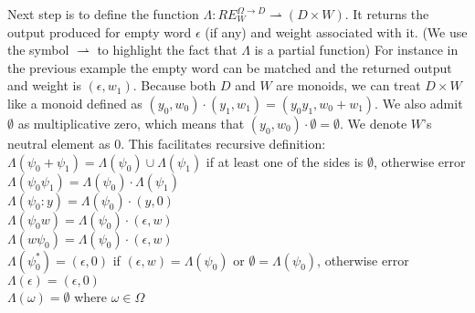 Next step is to define the function $\Lambda:RE_W^{\Omega\rightarrow D} \rightharpoonup ( D \times W)$. It returns the output produced for empty word $\epsilon$ (if any) and weight associated with it. (We use the symbol $\rightharpoonup$ to highlight the fact that $\Lambda$ is a partial function) For instance in the previous example the empty word can be matched and the returned output and weight is $(\epsilon,w_1)$. Because both $D$ and $W$ are monoids, we can treat $D \times W$ like a monoid defined as $(y_0,w_0)\cdot(y_1,w_1) = (y_0y_1,w_0+w_1)$. We also admit $\emptyset$ as multiplicative zero, which means that $(y_0,w_0)\cdot\emptyset=\emptyset$. We denote  $W$'s neutral element as $0$. This facilitates recursive definition: \\
$\Lambda(\psi_0+\psi_1) = \Lambda(\psi_0) \cup \Lambda(\psi_1)$ if at least one of the sides is $\emptyset$, otherwise error\\
$\Lambda(\psi_0\psi_1) =\Lambda(\psi_0) \cdot \Lambda(\psi_1)$ \\
$\Lambda(\psi_0 : y) = \Lambda(\psi_0) \cdot (y,0)$ \\
$\Lambda(\psi_0 w) = \Lambda(\psi_0) \cdot (\epsilon,w)$\\
$\Lambda(w \psi_0 ) =  \Lambda(\psi_0) \cdot (\epsilon,w)$ \\
$\Lambda(\psi_0^* ) = (\epsilon,0)$ if $(\epsilon,w) = \Lambda(\psi_0) $ or $\emptyset = \Lambda(\psi_0) $, otherwise error \\
$\Lambda(\epsilon) = (\epsilon,0)$\\
$\Lambda(\omega) = \emptyset$ where $\omega\in\Omega$

